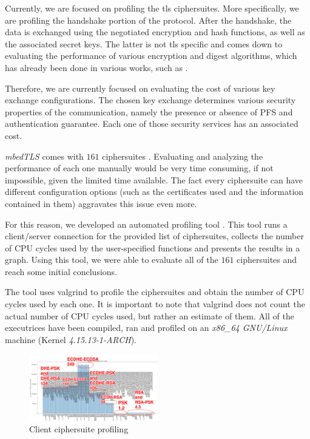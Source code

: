 \documentclass[conference]{IEEEtran}
\begin{document}
Currently, we are focused on profiling the
\gls{tls} ciphersuites. More specifically, we are profiling the
handshake portion of the protocol. After the handshake, the data
is exchanged using the negotiated encryption and hash functions,
as well as the associated secret keys. The latter is not
\gls{tls} specific and comes down to evaluating the performance of
various encryption and digest algorithms, which has already
been done in various works, such as \cite{kansal2014performance}
\cite{rihan2015performance} \cite{patil2016comprehensive} \cite{dahal2013performance}.

Therefore, we are currently focused on evaluating
the cost of various key exchange configurations. The chosen key
exchange determines various security properties of the communication,
namely the presence or absence of PFS and authentication guarantee.
Each one of those security services has an associated cost.

\textit{mbedTLS} comes with $161$ ciphersuites \cite{Supporte13:online}. Evaluating and analyzing the performance of each one manually would be very time consuming, if not impossible,
given the limited time available. The fact every ciphersuite can have
different configuration options (such as the certificates used and
the information contained in them) aggravates this issue even more.

For this reason, we developed an automated profiling tool \cite{iluxonch55:online}.
This tool runs a client/server connection for the provided list of
ciphersuites, collects the number of CPU cycles used by the user-specified
functions and presents the results in a graph. Using this tool, we were
able to evaluate all of the $161$ ciphersuites and reach some initial
conclusions.

The tool uses valgrind to profile the ciphersuites
and obtain the number of CPU cycles used by each one. It is important
to note that valgrind does not count the actual number of CPU
cycles used, but rather an estimate of them. All of the executrices
have been compiled, ran and profiled on an \textit{x86\_64 GNU/Linux} machine (Kernel \textit{4.15.13-1-ARCH}).

\begin{figure}
        \centering
        \includegraphics[width=0.5\textwidth]{./cli-graph.png} %
        \caption{\label{fig:cligraph} Client ciphersuite profiling}
\end{figure}
\end{document}
